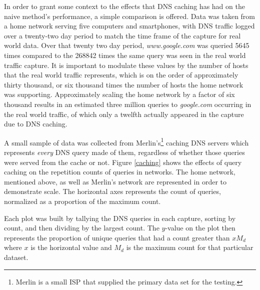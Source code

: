 \documentclass{llncs}
\begin{document}
In order to grant some context to the effects that DNS caching has had
on the naive method's performance, a simple comparison is offered. Data was
taken from a home network serving five computers and smartphones, with DNS
traffic logged over a twenty-two day period to match the time frame of the
capture for real world data. Over that twenty two day period,
\emph{www.google.com} was queried 5645 times compared to the 268842 times the
same query was seen in the real world traffic capture. It is important to modulate these
values by the number of hosts that the real world traffic represents, which
is on the order of approximately thirty thousand, or six thousand times the
number of hosts the home network was supporting. Approximately scaling the home network by a factor of six thousand results in an
estimated three million queries to \emph{google.com} occurring in the real world
traffic, of which only a twelfth actually appeared in the capture due to
DNS caching.

A small sample of data was collected from Merlin's\footnote{Merlin is a small ISP that supplied the primary data set for the testing.} caching DNS servers which
represents \emph{every} DNS query made of them, regardless of whether those
queries were served from the cache or not.
Figure \ref{caching} shows the effects of query caching on the repetition counts
of queries in networks. The home network, mentioned above, as well as Merlin's
network are represented in order to demonstrate scale. The horizontal axes
represents the count of queries, normalized as a proportion of the maximum
count. 

Each plot was built by tallying the DNS queries in each capture, sorting by
count, and then dividing by the largest count. The $y$-value on the plot then
represents the proportion of unique queries that had a count greater than $xM_d$
where $x$ is the horizontal value and $M_d$ is the maximum count for that particular
dataset.
\end{document}
